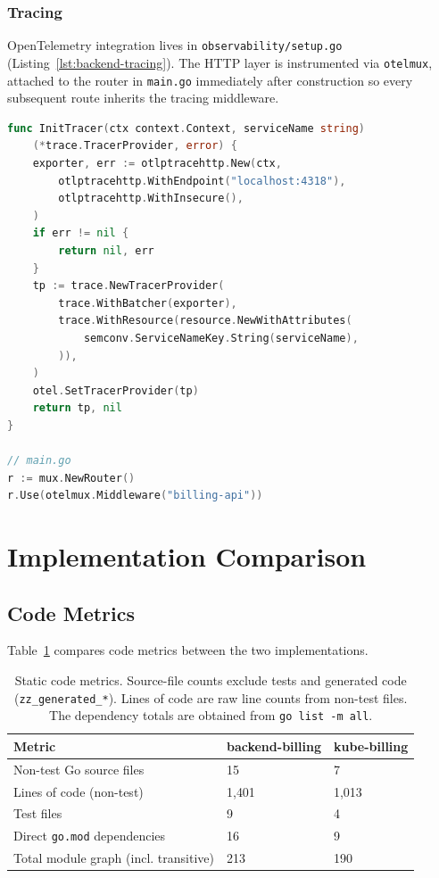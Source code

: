 \subsubsection{Tracing}

OpenTelemetry integration lives in \texttt{observability/setup.go} (Listing~\ref{lst:backend-tracing}). The HTTP layer is instrumented via \texttt{otelmux}, attached to the router in \texttt{main.go} immediately after construction so every subsequent route inherits the tracing middleware.

\begin{lstlisting}[language=Go, caption={Backend tracer initialisation}, label={lst:backend-tracing}]
func InitTracer(ctx context.Context, serviceName string)
    (*trace.TracerProvider, error) {
    exporter, err := otlptracehttp.New(ctx,
        otlptracehttp.WithEndpoint("localhost:4318"),
        otlptracehttp.WithInsecure(),
    )
    if err != nil {
        return nil, err
    }
    tp := trace.NewTracerProvider(
        trace.WithBatcher(exporter),
        trace.WithResource(resource.NewWithAttributes(
            semconv.ServiceNameKey.String(serviceName),
        )),
    )
    otel.SetTracerProvider(tp)
    return tp, nil
}

// main.go
r := mux.NewRouter()
r.Use(otelmux.Middleware("billing-api"))
\end{lstlisting}

\section{Implementation Comparison}

\subsection{Code Metrics}

Table~\ref{tab:code-metrics} compares code metrics between the two implementations.

\begin{table}[h]
\centering
\caption{Static code metrics. Source-file counts exclude tests and generated code (\texttt{zz\_generated\_*}). Lines of code are raw line counts from non-test files. The dependency totals are obtained from \texttt{go list -m all}.}
\label{tab:code-metrics}
\small\begin{tabularx}{\textwidth}{@{}lXX@{}}
\toprule
\textbf{Metric} & \textbf{backend-billing} & \textbf{kube-billing} \\ \midrule
Non-test Go source files & 15 & 7 \\
Lines of code (non-test) & 1{,}401 & 1{,}013 \\
Test files & 9 & 4 \\
Direct \texttt{go.mod} dependencies & 16 & 9 \\
Total module graph (incl. transitive) & 213 & 190 \\
\bottomrule
\end{tabularx}
\end{table}

